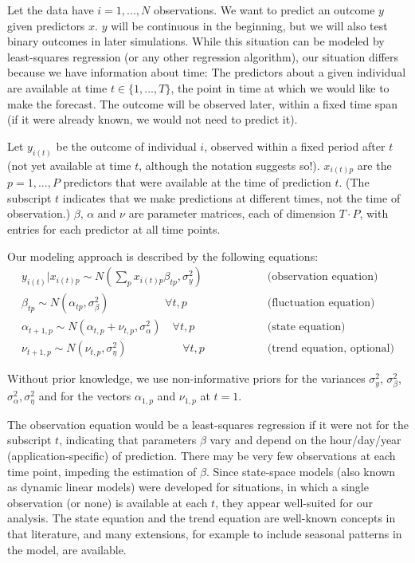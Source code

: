 \documentclass{article}
\begin{document}
Let the data have $i = 1, ..., N$ observations. We want to predict an outcome $y$ given predictors $x$. $y$ will be continuous in the beginning, but we will also test binary outcomes in later simulations. While this situation can be modeled by least-squares regression (or any other regression algorithm), our situation differs because we have information about time: The predictors about a given individual are available at time $t \in \{1, ..., T\}$, the point in time at which we would like to make the forecast. The outcome will be observed later, within a fixed time span (if it were already known, we would not need to predict it).

Let $y_{i(t)}$ be the outcome of individual $i$, observed within a fixed period after $t$ (not yet available at time $t$, although the notation suggests so!). $x_{i(t)p}$ are the $p = 1, ..., P$ predictors that were available at the time of prediction $t$. (The subscript $t$ indicates that we make predictions at different times, not the time of observation.) $\beta$, $\alpha$ and $\nu$ are parameter matrices, each of dimension $T \cdot P$, with entries for each predictor at all time points.

Our modeling approach is described by the following equations:
\begin{eqnarray}
y_{i(t)} | x_{i(t)p} \sim N(\sum_p x_{i(t)p} \beta_{tp}, \sigma_y^2) \textrm{~~~~~~~~~~~~~~~} & \textrm{(observation equation)} \\
\beta_{tp} \sim N(\alpha_{tp}, \sigma^2_{\beta}) \textrm{~~~~~~~~~~~~~~~} \forall t,p \textrm{~~~~~~~} & \textrm{(fluctuation equation)} \\
\alpha_{t+1,p} \sim N(\alpha_{t,p} + \nu_{t,p}, \sigma^2_{\alpha}) \textrm{~~~} \forall t,p \textrm{~~~~~~~} & \textrm{(state equation)} \\
\nu_{t+1,p} \sim N(\nu_{t,p}, \sigma^2_{\eta})\textrm{~~~~~~~~~~~~~~~} \forall t,p\textrm{~~~~~~~} & \textrm{(trend equation, optional)}
\end{eqnarray}

Without prior knowledge, we use non-informative priors for the variances $\sigma_y^2$, $\sigma^2_{\beta}$, $\sigma^2_{\alpha}, \sigma^2_{\eta}$ and for the vectors $\alpha_{1,p}$ and $\nu_{1,p}$ at $t=1$.

The observation equation would be a least-squares regression if it were not for the subscript $t$, indicating that parameters $\beta$ vary and depend on the hour/day/year (application-specific) of prediction. There may be very few observations at each time point, impeding the estimation of $\beta$. Since state-space models (also known as dynamic linear models) \citep{prado_time_2010, shumway_time_2011, durbin_time_2012} were developed for situations, in which a single observation (or none) is available at each $t$, they appear well-suited for our analysis. The state equation and the trend equation are well-known concepts in that literature, and many extensions, for example to include seasonal patterns in the model, are available.
\end{document}
